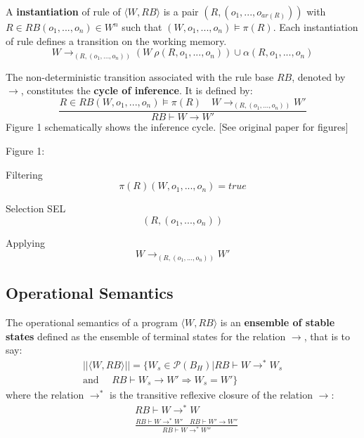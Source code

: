 A \textbf{instantiation} of rule of $\langle W, RB \rangle$ is a pair $(R, (o_1, ..., o_{ar(R)}))$ with
$R \in RB(o_1, ..., o_n) \in W^n$ such that $(W, o_1, ..., o_n) \vDash \pi(R)$.  Each instantiation of rule
defines a transition on the working memory.
\begin{equation}
W \rightarrow_{(R, (o_1, ... , o_n))} (W \ \rho(R, o_1, ..., o_n)) \cup \alpha(R, o_1, ..., o_n)
\nonumber
\end{equation}

The non-deterministic transition associated with the rule base $RB$, denoted by $\rightarrow$,
constitutes the \textbf{cycle of inference}. It is defined by:
\begin{equation}
\frac{R \in RB (W, o_1, ..., o_n) \vDash \pi(R) \quad W \rightarrow_{(R, (o_1, ..., o_n))} W'}
{RB \vdash W \rightarrow W'}
\end{equation}
Figure 1 schematically shows the inference cycle. [See original paper for figures]

Figure 1:

Filtering
\begin{equation}
\pi(R)(W, o_1, ..., o_n) = true
\nonumber
\end{equation}

Selection SEL
\begin{equation}
(R, (o_1, ..., o_n))
\nonumber
\end{equation}

Applying
\begin{equation}
W \rightarrow_{(R, (o_1, ..., o_n))} W'
\nonumber
\end{equation}

\subsection{Operational Semantics}

The operational semantics of a program $\langle W, RB \rangle$ is an \textbf{ensemble of stable states}
defined as the ensemble of terminal states for the relation $\rightarrow$, that is to say:
\begin{eqnarray}
|| \langle W, RB \rangle || = \{ W_s \in \mathcal{P} (B_H) | RB \vdash W \rightarrow^* W_s \nonumber \\
\mbox{and } \quad RB \vdash W_s \rightarrow W' \Rightarrow W_s = W' \} \nonumber
\end{eqnarray}
where the relation $\rightarrow^*$ is the transitive reflexive closure of the relation $\rightarrow$:
\begin{eqnarray}
& RB \vdash W \rightarrow^* W \nonumber \\
& \displaystyle \frac{RB \vdash W \rightarrow^* W' \quad RB \vdash W' \rightarrow W''}
{RB \vdash W \rightarrow^* W''} \nonumber
\end{eqnarray}

